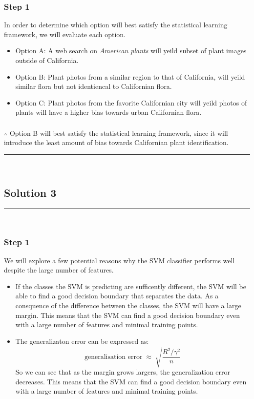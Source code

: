 \documentclass{article}
\begin{document}
\subsubsection*{Step 1}
\parbox{\textwidth}{
In order to determine which option will best satisfy the statistical learning framework, we will evaluate each option.
\begin{itemize}
    \item Option A: A web search on \textit{American plants} will yeild subset of plant images outside of California.
    \item Option B: Plant photos from a similar region to that of California, will yeild similar flora but not identiencal to Californian flora.
    \item Option C: Plant photos from the favorite Californian city will yeild photos of plants will have a higher bias towards urban Californian flora.
\end{itemize} 
}
\subsubsection*{\normalfont}{$\therefore$ Option B will best satisfy the statistical learning framework, since it will introduce the least amount of bias towards Californian plant identification.}\\

\noindent\rule{\textwidth}{0.4pt}\\

\newpage
\subsection*{Solution 3}
\noindent\rule{\textwidth}{0.4pt}\\

\subsubsection*{Step 1}
\parbox{\textwidth}{
We will explore a few potential reasons why the SVM classifier performs well despite the large number of features.
\begin{itemize}
\item If the classes the SVM is predicting are sufficently different, the SVM will be able to find a good decision boundary that separates the data.
      As a consquence of the difference between the classes, the SVM will have a large margin. This means that the SVM can find a good decision boundary even with a large number of features and minimal training points.

\item The generalizaton error can be  expressed as:
      \[
        \text{generalisation error} \;\approx\; 
        \sqrt{\dfrac{R^{2}/\gamma^{2}}{n}}
      \]
      So we can see that as the margin grows largers, the generalization error decreases. This means that the SVM can find a good decision boundary even with a large number of features and minimal training points.

\end{itemize}
}
\end{document}
